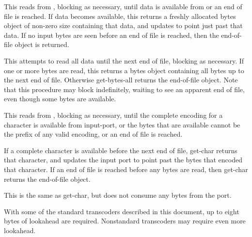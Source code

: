 \begin{entry}{%
}
   
This reads from , blocking as necessary, until data is
available from  or an end of file is reached.  If data
becomes available, this returns a freshly allocated bytes object of
non-zero size containing that data, and updates  to
point just past that data.  If no input bytes are seen before an end
of file is reached, then the end-of-file object is returned.
\end{entry}

\begin{entry}{%
}
   
This attempts to read all data until the next end of file, blocking as
necessary. If one or more bytes are read, this returns a bytes object
containing all bytes up to the next end of file.  Otherwise {\cf
  get-bytes-all} returns the end-of-file object. Note that this
procedure may block indefinitely, waiting to see an apparent end of
file, even though some bytes are available.
\end{entry}

\begin{entry}{%
}
   
This reads from , blocking as necessary, until the
complete encoding for a character is available from input-port, or the
bytes that are available cannot be the prefix of any valid encoding,
or an end of file is reached.

If a complete character is available before the next end of file, {\cf
  get-char} returns that character, and updates the input port to
point past the bytes that encoded that character. If an end of file is
reached before any bytes are read, then {\cf get-char} returns the
end-of-file object.
\end{entry}

\begin{entry}{%
}
   
This is the same as {\cf get-char}, but does not consume any bytes
from the port.

\begin{note}
  With some of the standard transcoders
  described in this document, up to eight bytes of lookahead are
  required. Nonstandard transcoders may require even more lookahead.
\end{note}
\end{entry}

